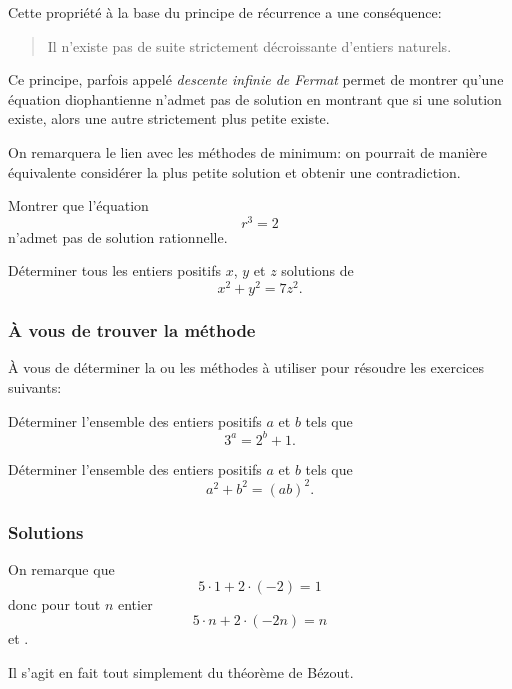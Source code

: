 Cette propriété à la base du principe de récurrence a une conséquence:
\begin{quote}
  Il n'existe pas de suite strictement décroissante d'entiers naturels.
\end{quote}

Ce principe, parfois appelé \emph{descente infinie de Fermat} permet de montrer qu'une équation diophantienne n'admet pas de solution en montrant que si une solution existe, alors une autre strictement plus petite existe.

On remarquera le lien avec les méthodes de minimum: on pourrait de manière équivalente considérer la plus petite solution et obtenir une contradiction.

\begin{exo}
  Montrer que l'équation
  $$r^3 = 2$$
  n'admet pas de solution rationnelle.
\end{exo}

\begin{exo}[Bac 2003]
  Déterminer tous les entiers positifs $x$, $y$ et $z$ solutions de
  $$x^2 + y^2 = 7 z^2.$$
\end{exo}

\subsubsection{À vous de trouver la méthode}

À vous de déterminer la ou les méthodes à utiliser pour résoudre les exercices suivants:

\begin{exo}
Déterminer l'ensemble des entiers positifs $a$ et $b$ tels que
$$3^a = 2^b +1.$$
\end{exo}

\begin{exo}
Déterminer l'ensemble des entiers positifs $a$ et $b$ tels que
$$a^2 + b^2 = (ab)^2.$$
\end{exo}

\subsubsection{Solutions}

\begin{sol}
On remarque que
$$5 \cdot 1 + 2 \cdot (-2) = 1$$
donc pour tout $n$ entier
$$5 \cdot n + 2 \cdot (-2n) = n$$
et .

Il s'agit en fait tout simplement du théorème de Bézout.
\end{sol}

